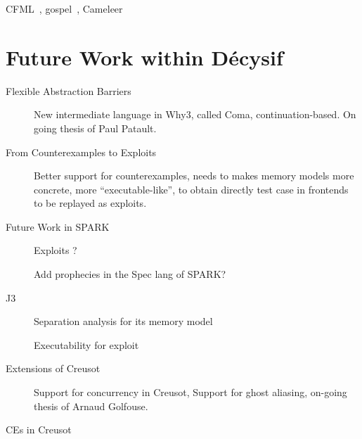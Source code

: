 \documentclass[a4paper,11pt]{article}
\begin{document}
CFML~\cite{chargueraud08icfp}, gospel~\cite{gospelfm19}, Cameleer~\cite{DBLP:conf/cav/PereiraR20}


\section{Future Work within Décysif}
\label{sec:future}



\begin{description}
\item[Flexible Abstraction Barriers]

  New intermediate language in Why3, called Coma, continuation-based. On going thesis of
  Paul Patault.

\item[From Counterexamples to Exploits]

  Better support for counterexamples, needs to makes memory models
  more concrete, more ``executable-like'', to obtain directly test
  case in frontends to be replayed as exploits.

\item[Future Work in SPARK]

  Exploits ?

  Add prophecies in the Spec lang of SPARK?

\item[J3]

  Separation analysis for its memory model

  Executability for exploit

\item[Extensions of Creusot]

  Support for concurrency in Creusot, Support for ghost aliasing, on-going
  thesis of Arnaud Golfouse.

\item[CEs in Creusot]

\end{description}


%


\end{document}
